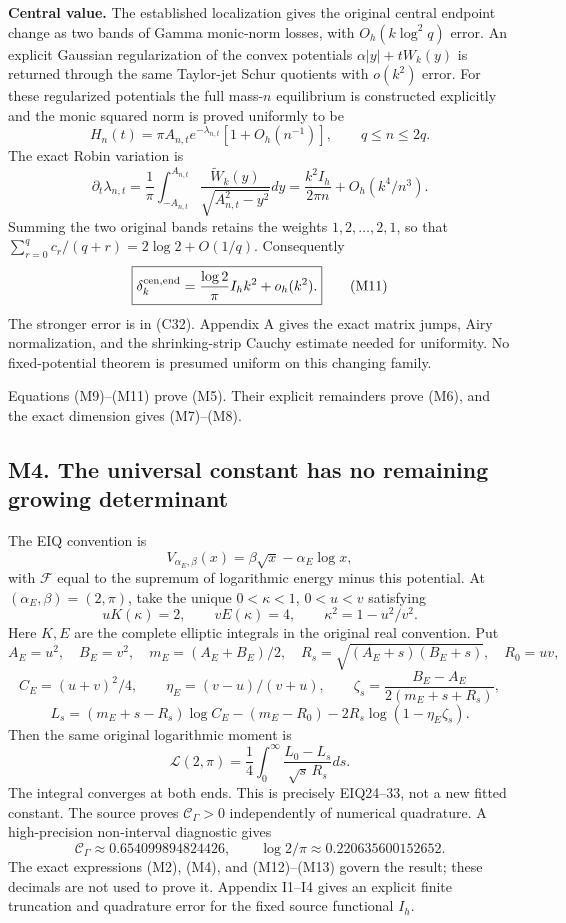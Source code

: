 \documentclass[11pt,a4paper]{article}
\begin{document}
\textbf{Central value.} The established localization gives the original
central endpoint change as two bands of Gamma monic-norm losses, with
\(O_h(k\log^2q)\) error. An explicit Gaussian regularization of the
convex potentials \(\alpha|y|+tW_k(y)\) is returned through the same
Taylor-jet Schur quotients with \(o(k^2)\) error. For these regularized
potentials the full mass-\(n\) equilibrium is constructed explicitly and
the monic squared norm is proved uniformly to be \[
H_n(t)=\pi A_{n,t}e^{-\lambda_{n,t}}[1+O_h(n^{-1})],
\qquad q\le n\le2q.
\] The exact Robin variation is \[
\partial_t\lambda_{n,t}
=\frac1\pi\int_{-A_{n,t}}^{A_{n,t}}
\frac{\widetilde W_k(y)}{\sqrt{A_{n,t}^2-y^2}}dy
=\frac{k^2I_h}{2\pi n}+O_h(k^4/n^3).
\] Summing the two original bands retains the weights
\(1,2,\ldots,2,1\), so that \(\sum_{r=0}^q c_r/(q+r)=2\log2+O(1/q)\).
Consequently \[
\boxed{\delta_k^{\rm cen,end}
=\frac{\log2}{\pi}I_hk^2+o_h(k^2).}\tag{M11}
\] The stronger error is in (C32). Appendix A gives the exact matrix
jumps, Airy normalization, and the shrinking-strip Cauchy estimate
needed for uniformity. No fixed-potential theorem is presumed uniform on
this changing family.

Equations (M9)--(M11) prove (M5). Their explicit remainders prove (M6),
and the exact dimension gives (M7)--(M8).

\subsection{M4. The universal constant has no remaining growing
determinant}\label{sa:m4.-the-universal-constant-has-no-remaining-growing-determinant}

The EIQ convention is \[
V_{\alpha_E,\beta}(x)=\beta\sqrt x-\alpha_E\log x,
\] with \(\mathcal F\) equal to the supremum of logarithmic energy minus
this potential. At \((\alpha_E,\beta)=(2,\pi)\), take the unique
\(0<\kappa<1\), \(0<u<v\) satisfying \[
uK(\kappa)=2,\qquad vE(\kappa)=4,\qquad
\kappa^2=1-u^2/v^2.
\tag{M12}
\] Here \(K,E\) are the complete elliptic integrals in the original real
convention. Put \[
A_E=u^2,\quad B_E=v^2,\quad m_E=(A_E+B_E)/2,\quad
R_s=\sqrt{(A_E+s)(B_E+s)},\quad R_0=uv,
\] \[
C_E=(u+v)^2/4,\qquad \eta_E=(v-u)/(v+u),\qquad
\zeta_s=\frac{B_E-A_E}{2(m_E+s+R_s)},
\] \[
L_s=(m_E+s-R_s)\log C_E-(m_E-R_0)
-2R_s\log(1-\eta_E\zeta_s).
\] Then the same original logarithmic moment is \[
\boxed{\mathcal L(2,\pi)=
\frac14\int_0^\infty\frac{L_0-L_s}{\sqrt s\,R_s}ds.}\tag{M13}
\] The integral converges at both ends. This is precisely EIQ24--33, not
a new fitted constant. The source proves \(\mathcal C_\Gamma>0\)
independently of numerical quadrature. A high-precision non-interval
diagnostic gives \[
\mathcal C_\Gamma\approx0.654099894824426,\qquad
\log2/\pi\approx0.220635600152652.
\] The exact expressions (M2), (M4), and (M12)--(M13) govern the result;
these decimals are not used to prove it. Appendix I1--I4 gives an
explicit finite truncation and quadrature error for the fixed source
functional \(I_h\).
\end{document}
